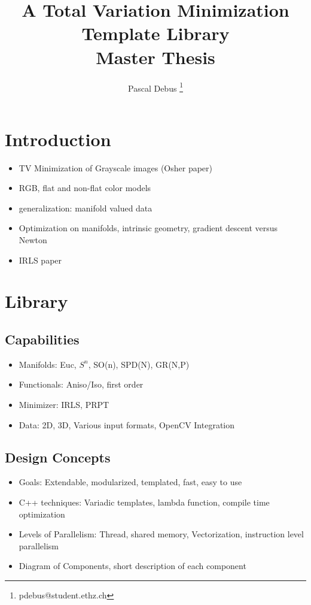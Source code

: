 \documentclass[7pt]{article}
\title{A Total Variation Minimization Template Library \\ Master Thesis}
\author{Pascal Debus \footnote{pdebus@student.ethz.ch}}
\begin{document}
\maketitle

\begin{body}

\section{Introduction}
\begin{itemize}

\item TV Minimization of Grayscale images (Osher paper)
\item RGB, flat and non-flat color models
\item generalization: manifold valued data
\item Optimization on manifolds, intrinsic geometry, gradient descent versus Newton
\item IRLS paper

\end{itemize}

\section{Library}

\subsection{Capabilities}
\begin{itemize}
\item Manifolds: Euc, $S^n$, SO(n), SPD(N), GR(N,P)
\item Functionals: Aniso/Iso, first order
\item Minimizer: IRLS, PRPT
\item Data: 2D, 3D, Various input formats, OpenCV Integration
\end{itemize}

\subsection{Design Concepts}
\begin{itemize}
\item Goals: Extendable, modularized, templated, fast, easy to use
\item C++ techniques: Variadic templates, lambda function, compile time optimization
\item Levels of Parallelism: Thread, shared memory, Vectorization, instruction level parallelism
\item Diagram of Components, short description of each component
\end{itemize}

\end{body}
\end{document}
